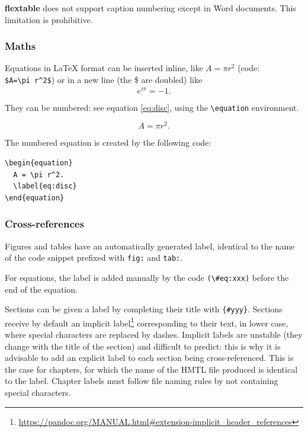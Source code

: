 \documentclass[
  12pt,
  american,
  a4paper,
  extrafontsizes,onecolumn,openright
  ]{memoir}
\begin{document}
\textbf{flextable} does not support caption numbering except in Word documents.
This limitation is prohibitive.

\subsubsection{Maths}\label{maths}

Equations in LaTeX format can be inserted inline, like \(A=\pi r^2\) (code: \texttt{\$A=\textbackslash{}pi\ r\^{}2\$}) or in a new line (the \$ are doubled) like \[e^{i \pi} = -1.\]

They can be numbered: see equation \eqref{eq:disc}, using the \texttt{\textbackslash{}equation} environment.

\begin{equation}
  A = \pi r^2.
  \label{eq:disc}
\end{equation}

The numbered equation is created by the following code:

\begin{verbatim}
\begin{equation}
  A = \pi r^2.
  \label{eq:disc}
\end{equation}
\end{verbatim}

\subsubsection{Cross-references}\label{cross-references}

Figures and tables have an automatically generated label, identical to the name of the code snippet prefixed with \texttt{fig:} and \texttt{tab:}.

For equations, the label is added manually by the code \texttt{(\textbackslash{}\#eq:xxx)} before the end of the equation.

Sections can be given a label by completing their title with \texttt{\{\#yyy\}}.
Sections receive by default an implicit label\footnote{\url{https://pandoc.org/MANUAL.html\#extension-implicit_header_references}} corresponding to their text, in lower case, where special characters are replaced by dashes.
Implicit labels are unstable (they change with the title of the section) and difficult to predict: this is why it is advisable to add an explicit label to each section being cross-referenced.
This is the case for chapters, for which the name of the HMTL file produced is identical to the label.
Chapter labels must follow file naming rules by not containing special characters.
\end{document}

